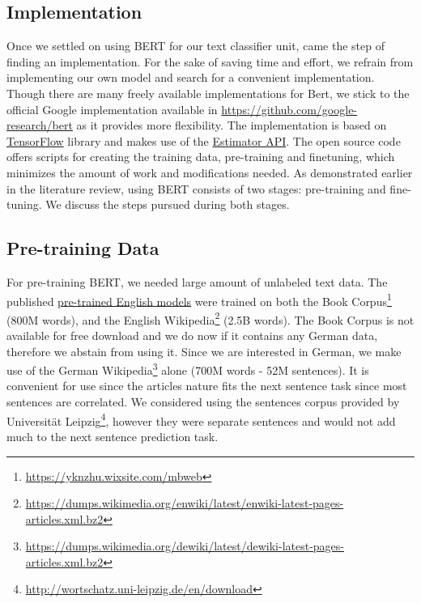 \subsection{Implementation}
Once we settled on using \ac{BERT} for our text classifier unit, came the step of finding an implementation. For the sake of saving time and effort, we refrain from implementing our own model and search for a convenient implementation. Though there are many freely available implementations for Bert, we stick to the official Google implementation available in \url{https://github.com/google-research/bert} as it provides more flexibility. The implementation is based on \href{https://www.tensorflow.org/}{TensorFlow} library and makes use of the \href{https://www.tensorflow.org/api_docs/python/tf/estimator/Estimator}{Estimator API}. The open source code offers scripts for creating the training data, pre-training and finetuning, which minimizes the amount of work and modifications needed. As demonstrated earlier in the literature review, using \ac{BERT} consists of two stages: pre-training and fine-tuning. We discuss the steps pursued during both stages.

\subsection{Pre-training Data}
For pre-training \ac{BERT}, we needed large amount of unlabeled text data. The published \href{https://github.com/google-research/bert#pre-trained-models}{pre-trained English models} were trained on both the Book Corpus\footnote{\url{https://yknzhu.wixsite.com/mbweb}} (800M words), and the English Wikipedia\footnote{\url{https://dumps.wikimedia.org/enwiki/latest/enwiki-latest-pages-articles.xml.bz2}} (2.5B words). The Book Corpus is not available for free download and we do now if it contains any German data, therefore we abstain from using it. Since we are interested in German, we make use of the German Wikipedia\footnote{\url{https://dumps.wikimedia.org/dewiki/latest/dewiki-latest-pages-articles.xml.bz2}} alone (700M words - 52M sentences). It is convenient for use since the articles nature fits the next sentence task since most sentences are correlated. We considered using the sentences corpus provided by Universit{\"a}t Leipzig\footnote{\url{http://wortschatz.uni-leipzig.de/en/download}}, however they were separate sentences and would not add much to the next sentence prediction task. 

